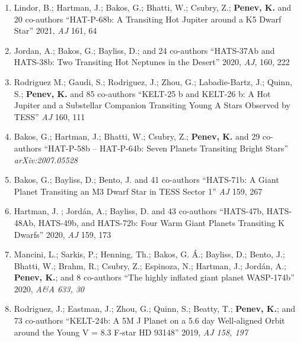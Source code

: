 \begin{enumerate}
    \item Lindor, B.; Hartman, J.; Bakos, G.; Bhatti, W.; Csubry, Z.;
        \textbf{Penev, K.} and 20 co-authors ``HAT-P-68b: A Transiting Hot
        Jupiter around a K5 Dwarf Star'' 2021, {\em AJ} 161, 64

    \item Jordan, A.; Bakos, G.; Bayliss, D.; and 24 co-authors ``HATS-37Ab and
        HATS-38b: Two Transiting Hot Neptunes in the Desert'' 2020, {\em AJ},
        160, 222

    \item Rodriguez M.; Gaudi, S.; Rodriguez, J.; Zhou, G.; Labadie-Bartz, J.;
        Quinn, S.; \textbf{Penev, K.} and 85 co-authors ``KELT-25 b and KELT-26
        b: A Hot Jupiter and a Substellar Companion Transiting Young A Stars
        Observed by TESS'' {\em AJ} 160, 111

    \item Bakos, G.; Hartman, J.; Bhatti, W.; Csubry, Z.; \textbf{Penev, K.} and
        29 co-authors ``HAT-P-58b -- HAT-P-64b: Seven Planets Transiting Bright
        Stars'' {\em arXiv:2007.05528}

    \item Bakos, G.; Bayliss, D.; Bento, J. and 41 co-authors ``HATS-71b: A
        Giant Planet Transiting an M3 Dwarf Star in TESS Sector 1'' {\em AJ}
        159, 267

    \item Hartman, J. ; Jordán, A.; Bayliss, D. and 43 co-authors ``HATS-47b,
        HATS-48Ab, HATS-49b, and HATS-72b: Four Warm Giant Planets Transiting K
        Dwarfs'' 2020, {\em AJ} 159, 173

    \item Mancini, L.; Sarkis, P.; Henning, Th.; Bakos, G. Á.; Bayliss, D.;
        Bento, J.; Bhatti, W.; Brahm, R.; Csubry, Z.; Espinoza, N.; Hartman, J.;
        Jordán, A.; \textbf{Penev, K.}; and 8 co-authors ``The highly inflated
        giant planet WASP-174b'' 2020, \em{A\&A} 633, 30

    \item Rodriguez, J.; Eastman, J.; Zhou, G.; Quinn, S.; Beatty, T.;
        \textbf{Penev, K.}; and 73 co-authors ``KELT-24b: A 5M J Planet on a 5.6
        day Well-aligned Orbit around the Young V = 8.3 F-star HD 93148'' 2019,
        \em{AJ} 158, 197


\end{enumerate}

